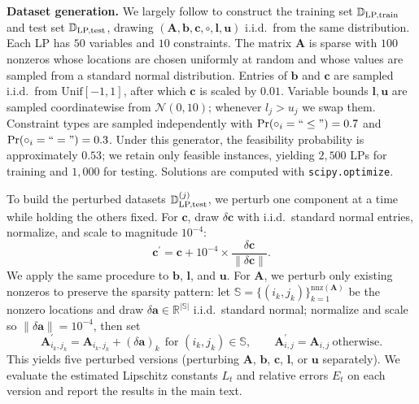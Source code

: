 \documentclass{amsart} %
\def\va{{\bm{a}}}
\def\vb{{\bm{b}}}
\def\vc{{\bm{c}}}
\def\vl{{\bm{l}}}
\def\vu{{\bm{u}}}
\def\mA{{\bm{A}}}
\def\sD{{\mathbb{D}}}
\def\sR{{\mathbb{R}}}
\def\sS{{\mathbb{S}}}
\theoremstyle{definition}
\theoremstyle{remark}
\begin{document}
\textbf{Dataset generation.}
We largely follow \cite{chen2023lp} to construct the training set $\sD_{\textup{LP,train}}$ and test set $\sD_{\textup{LP,test}}$, drawing $(\mA,\vb,\vc,\circ,\vl,\vu)$ i.i.d.\ from the same distribution. Each LP has $50$ variables and $10$ constraints. The matrix $\mA$ is sparse with $100$ nonzeros whose locations are chosen uniformly at random and whose values are sampled from a standard normal distribution. Entries of $\vb$ and $\vc$ are sampled i.i.d.\ from $\mathrm{Unif}[-1,1]$, after which $\vc$ is scaled by $0.01$. Variable bounds $\vl,\vu$ are sampled coordinatewise from $\mathcal{N}(0,10)$; whenever $l_j>u_j$ we swap them. Constraint types are sampled independently with $\Pr(\circ_i=``\leq")=0.7$ and $\Pr(\circ_i=``=")=0.3$. Under this generator, the feasibility probability is approximately $0.53$; we retain only feasible instances, yielding $2{,}500$ LPs for training and $1{,}000$ for testing. Solutions are computed with \texttt{scipy.optimize}.

To build the perturbed datasets $\sD^{(j)}_{\textup{LP,test}}$, we perturb one component at a time while holding the others fixed. For $\vc$, draw $\delta\vc$ with i.i.d.\ standard normal entries, normalize, and scale to magnitude $10^{-4}$:
\[
\vc^\prime=\vc+10^{-4}\times\frac{\delta\vc}{\|\delta\vc\|}.
\]
We apply the same procedure to $\vb$, $\vl$, and $\vu$. For $\mA$, we perturb only existing nonzeros to preserve the sparsity pattern: let $\sS=\{(i_k,j_k)\}_{k=1}^{\mathrm{nnz}(\mA)}$ be the nonzero locations and draw $\delta\va\in\sR^{|\sS|}$ i.i.d.\ standard normal; normalize and scale so $\|\delta\va\|=10^{-4}$, then set
\[
\mA^\prime_{i_k,j_k}=\mA_{i_k,j_k}+(\delta\va)_k\ \ \text{for }(i_k,j_k)\in\sS,\qquad
\mA^\prime_{i,j}=\mA_{i,j}\ \text{otherwise}.
\]
This yields five perturbed versions (perturbing $\mA$, $\vb$, $\vc$, $\vl$, or $\vu$ separately). We evaluate the estimated Lipschitz constants $L_t$ and relative errors $E_t$ on each version and report the results in the main text.
\end{document}
